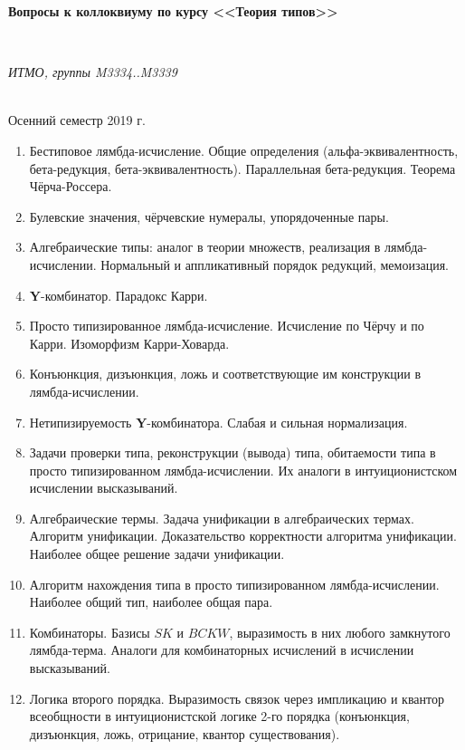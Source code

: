\documentclass[11pt,a4paper,oneside]{article}
\begin{document}
\begin{center}
\begin{Large}{\bfseries Вопросы к коллоквиуму по курсу <<Теория типов>>}\end{Large}\\
\vspace{1mm}
\begin{small} \itshape ИТМО, группы M3334..M3339\end{small}\\
\small Осенний семестр 2019 г.
\end{center}

\begin{enumerate}
\item Бестиповое лямбда-исчисление. Общие определения (альфа-эквивалентность, бета-редукция, бета-эквивалентность).
Параллельная бета-редукция. Теорема Чёрча-Россера.
\item Булевские значения, чёрчевские нумералы, упорядоченные пары.
\item Алгебраические типы: аналог в теории множеств, реализация в лямбда-исчислении. 
Нормальный и аппликативный порядок редукций, мемоизация.
\item \textbf{Y}-комбинатор. Парадокс Карри.
\item Просто типизированное лямбда-исчисление. Исчисление по Чёрчу и по Карри. Изоморфизм Карри-Ховарда.
\item Конъюнкция, дизъюнкция, ложь и соответствующие им конструкции в лямбда-исчислении.
\item Нетипизируемость \textbf{Y}-комбинатора. Слабая и сильная нормализация.
\item Задачи проверки типа, реконструкции (вывода) типа, обитаемости типа в просто типизированном лямбда-исчислении.
Их аналоги в интуиционистском исчислении высказываний.
\item Алгебраические термы. Задача унификации в алгебраических термах. Алгоритм унификации. Доказательство 
корректности алгоритма унификации. Наиболее общее решение задачи унификации.
\item Алгоритм нахождения типа в просто типизированном лямбда-исчислении. Наиболее общий тип, наиболее общая пара.
\item Комбинаторы. Базисы $SK$ и $BCKW$, выразимость в них любого замкнутого лямбда-терма.
Аналоги для комбинаторных исчислений в исчислении высказываний.
\item Логика второго порядка. Выразимость связок через импликацию и квантор всеобщности в интуиционистской логике 
2-го порядка (конъюнкция, дизъюнкция, ложь, отрицание, квантор существования).

\end{enumerate}
\end{document}
